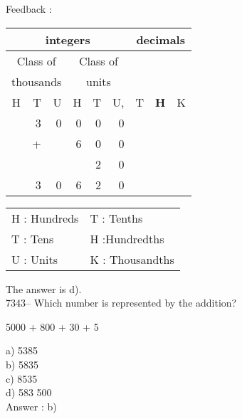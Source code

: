 \documentclass[letterpaper, 12pt]{article}
\begin{document}
Feedback :\\
\begin{center}
\begin{tabular}{|rrr|rrr|rrr|}
\hline
\multicolumn{6}{|c|}{integers} &\multicolumn{3}{|c|}{decimals} \\
\hline
\multicolumn{3}{|c|}{Class of} &\multicolumn{3}{|c|}{Class of} &  \multicolumn{3}{c|}{} \\
\multicolumn{3}{|c|}{thousands} &\multicolumn{3}{|c|}{units} &  \multicolumn{3}{c|}{} \\
\hline
H & T & U &H & T & U, & T\up{th} & \textbf{H\up{th}} & K\up{th} \\
\hline
\hline
 & 3 & 0 & 0 & 0 & 0 & & & \\
 & + &   & 6 & 0 & 0 & & & \\
 &   &   &   & 2 & 0 & & & \\
\hline
\hline
 & 3 & 0 & 6 & 2 & 0 & & & \\
\hline
\end{tabular}
\end{center}

\scriptsize
\begin{center}
\begin{tabular}{ll}
H : Hundreds & T\up{th} : Tenths\\
T : Tens & H\up{th} :Hundredths\\
U : Units & K\up{e} : Thousandths\\
\end{tabular}
\end{center}

\normalsize
The answer is d).\\


7343-- Which number is represented by the addition?\\
\begin{center}
5000 + 800 + 30 + 5
\end{center}

a) 5385\\
b) 5835\\
c) 8535\\
d) 583 500\\

Answer : b)\\
\end{document}

